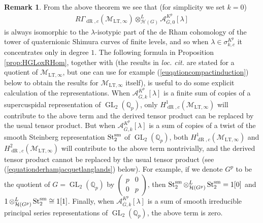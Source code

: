 \documentclass{article}
\theoremstyle{definition}
\newtheorem{remark}[theorem]{Remark}
\def\calA{\mathcal{A}}
\def\calH{\mathcal{H}}
\def\calM{\mathcal{M}}
\def\bbQ{\mathbb{Q}}
\DeclareMathOperator{\ox}{\otimes}
\def\isom{\cong}
\DeclareMathOperator{\GL}{GL}
\DeclareMathOperator{\dR}{dR}
\def\LT{\mathrm{LT}}
\def\bar{\overline}
\def\St{\mathrm{St}}
\begin{document}
\begin{remark}\label{remarkderhamtensor}
From the above theorem we see that (for simplicity we set $k=0$)
\begin{align*}
    R\Gamma_{\dR,c}(\calM_{\LT,\infty})\ox_{\calH(G)}^L \calA_{\bar G,0}^{K^p}[\lambda]
\end{align*}
is always isomorphic to the $\lambda$-isotypic part of the de Rham cohomology of the tower of quaternionic Shimura curves of finite levels, and so when $\lambda\in \sigma^{K^p}_{k,c}$ it concentrates only in degree $1$. The following formula in Proposition \ref{prop:HGLoxRHom}, together with \cite[Théorème 4.1, Théorème 5.8, \S 5.1]{CDN20} (the results in \textit{loc. cit.} are stated for a quotient of $\calM_{\LT,\infty}$, but one can use for example (\ref{euqationcompactinduction}) below to obtain the results for $\calM_{\LT,\infty}$ itself), is useful to do some explicit calculation of the representations. When $\calA_{\bar G,k}^{K^p}[\lambda]$ is a finite sum of copies of a supercuspidal representation of $\GL_2(\bbQ_p)$, only $H^1_{\dR,c}(\calM_{\LT,\infty})$ will contribute to the above term and the derived tensor product can be replaced by the usual tensor product. But when $\calA_{\bar G,k}^{K^p}[\lambda]$ is a sum of copies of a twist of the smooth Steinberg representation $\St_2^{\rm sm}$ of $\GL_2(\bbQ_p)$, both $H^1_{\dR,c}(\calM_{\LT,\infty})$ and $H^2_{\dR,c}(\calM_{\LT,\infty})$ will contribute to the above term nontrivially, and the derived tensor product cannot be replaced by the usual tensor product (see (\ref{equationderhamjacquetlanglands}) below). For example, if we denote $G^p$ to be the quotient of $G=\GL_2(\bbQ_p)$ by $\begin{pmatrix} p&0\\0&p\end{pmatrix}$, then $\St_2^{\rm sm}\ox^L_{\calH(G^p)}\St_2^{\rm sm}=1[0]$ and $1\ox^L_{\calH(G^p)}\St_2^{\rm sm}\isom 1[1]$. Finally, when $\calA_{\bar G,k}^{K^p}[\lambda]$ is a sum of smooth irreducible principal series representations of $\GL_2(\bbQ_p)$, the above term is zero. 
\end{remark}
\end{document}
